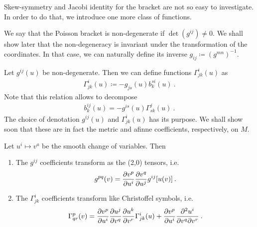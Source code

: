 Skew-symmetry and Jacobi identity for the bracket are not so easy to investigate. In order to do that, we introduce one more class of functions.

We say that the Poisson bracket is non-degenerate if $\det(g^{ij}) \neq 0$. We shall show later that the non-degeneracy is invariant under the transformation of the coordinates. In that case, we can naturally define its inverse $g_{ij} \coloneqq (g^{mn})^{-1}$.

Let $g^{ij}(u)$ be non-degenerate. Then we can define functions $\Gamma^{i}_{jk}(u)$ as
\begin{align}
    \Gamma^i_{jk}(u) \coloneqq - g_{js}(u) b^{s i}_k(u) \:.
\end{align}
Note that this relation allows to decompose
\begin{align}
    b_k^{ij}(u) = -g^{is}(u) \Gamma^j_{sk}(u) \:. \label{eq:b=g*Gamma}
\end{align}
The choice of denotation $g^{ij}(u)$ and $\Gamma^{i}_{jk}(u)$ has its purpose. We shall show soon that these are in fact the metric and afinne coefficients, respectively, on $M$.


\begin{proposition} \label{prop:transoformace}
    Let $u^i \mapsto v^a$ be the smooth change of variables. Then
    \begin{enumerate}
        \item The $g^{ij}$ coefficients transform as the (2,0) tensors, i.e. 
        \begin{align}
            g^{pq}(v) = \frac{\partial v^p}{\partial u^i} \frac{\partial v^q}{\partial u^j} g^{ij}[u(v)] \:. \label{eq:transformace-metrika}
        \end{align}
        \item The $\Gamma^i_{jk}$ coefficients  transform like Christoffel symbols, i.e.
        \begin{align}
            \Gamma^p_{qr} (v) = \frac{\partial v^p}{\partial u^i} \frac{\partial u^j}{\partial v^q} \frac{\partial u^k}{\partial v^r} \Gamma^i_{jk}(u) + \frac{\partial v^p}{\partial u^i} \frac{\partial^2 u^i}{\partial v^q \partial v^r} \:. \label{eq:transformace-konexe}
        \end{align}
    \end{enumerate}
\end{proposition}

